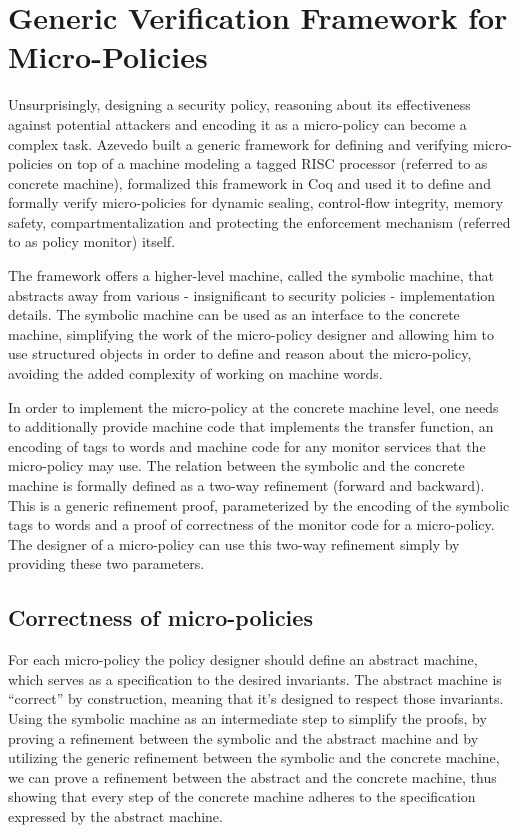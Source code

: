 \section{Generic Verification Framework for Micro-Policies}
\label{sec:framework}

Unsurprisingly, designing a security policy, reasoning about its
effectiveness against potential attackers and encoding it as a
micro-policy can become a complex task. Azevedo \ETAL
\cite{popl2015} built a generic framework for defining and
verifying micro-policies on top of a machine modeling a tagged RISC
processor (referred to as concrete machine), formalized this framework
in Coq and used it to define and formally verify micro-policies for
dynamic sealing, control-flow integrity, memory safety,
compartmentalization and protecting the enforcement mechanism
(referred to as policy monitor) itself.

The framework offers a higher-level machine, called the symbolic
machine, that abstracts away from various - insignificant to security
policies - implementation details. The symbolic machine can be used as
an interface to the concrete machine, simplifying the work of the
micro-policy designer and allowing him to use structured objects in
order to define and reason about the micro-policy, avoiding the
added complexity of working on machine words.


In order to implement the micro-policy at the concrete machine level, one needs
to additionally provide machine code that implements the transfer function, an
encoding of tags to words and machine code for any monitor services that the
micro-policy may use. The relation between the symbolic and the concrete machine
is formally defined as a two-way refinement (forward and backward). This is a
generic refinement proof, parameterized by the encoding of the symbolic tags to
words and a proof of correctness of the monitor code for a micro-policy.
The designer of a micro-policy can use this two-way refinement simply by
providing these two parameters.

\subsection{Correctness of micro-policies}\label{sec:verification}

For each micro-policy the policy designer should define an abstract
machine, which serves as a specification to the desired invariants.
The abstract machine is ``correct'' by construction, meaning that it's
designed to respect those invariants. Using the symbolic machine as an
intermediate step to simplify the proofs, by proving a refinement
between the symbolic and the abstract machine and by utilizing the
generic refinement between the symbolic and the concrete machine, we
can prove a refinement between the abstract and the concrete machine,
thus showing that every step of the concrete machine adheres to the
specification expressed by the abstract machine.

